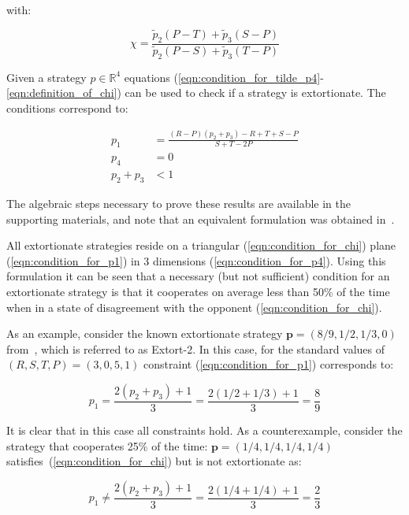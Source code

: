 \documentclass[a4paper]{article}
\begin{document}
with:

\begin{equation}\label{eqn:definition_of_chi}
    \chi = \frac{\tilde p_2 (P - T) + \tilde p_3 (S - P)}
                {\tilde p_2 (P - S) + \tilde p_3 (T - P)}
\end{equation}

Given a strategy \(p\in\mathbb{R}^{4}\) equations
(\ref{eqn:condition_for_tilde_p4}-\ref{eqn:definition_of_chi}) can be used to
check if a strategy is extortionate. The conditions correspond to:

\begin{align}
    p_1 & = \frac{(R-P)(p_2 + p_3) - R + T + S - P}{S + T - 2P}
     \label{eqn:condition_for_p1}\\
    p_4 & = 0 \label{eqn:condition_for_p4}\\
    p_2 + p_3 & < 1\label{eqn:condition_for_chi}
\end{align}

The algebraic steps necessary to prove these results are available in the
supporting materials, and note that an equivalent formulation was obtained
in~\cite{adami2013evolutionary}.

All extortionate strategies reside on a triangular (\ref{eqn:condition_for_chi})
plane (\ref{eqn:condition_for_p1}) in 3 dimensions (\ref{eqn:condition_for_p4}).
Using this formulation it can be seen that a necessary (but not sufficient)
condition for an extortionate strategy is that it cooperates on average less
than 50\% of the time when in a state of disagreement with the opponent
(\ref{eqn:condition_for_chi}).

As an example, consider the known extortionate strategy \(\textbf{p}=(8 / 9, 1 / 2, 1 /
3, 0)\) from~\cite{Stewart2012}, which is referred to as Extort-2. In
this case, for the standard values of \((R, S, T, P) = (3, 0, 5, 1)\)
constraint (\ref{eqn:condition_for_p1}) corresponds to:

\begin{equation}
    p_1 = \frac{2(p_2 + p_3) + 1}{3}
        = \frac{2(1 / 2 + 1 / 3) + 1}{3}
        = \frac{8}{9}
\end{equation}

It is clear that in this case all constraints hold. As a counterexample,
consider the strategy that cooperates 25\% of the time: \(\textbf{p}=(1 /4, 1 / 4, 1 / 4,
1 / 4)\) satisfies~(\ref{eqn:condition_for_chi}) but is not extortionate as:

\begin{equation}
    p_1 \ne \frac{2(p_2 + p_3) + 1}{3}
        = \frac{2(1 / 4 + 1 / 4) + 1}{3}
        = \frac{2}{3}
\end{equation}
\end{document}
